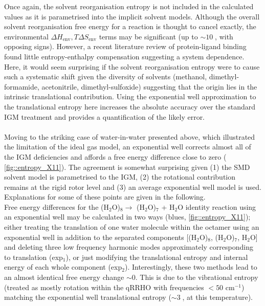 \documentclass[../main.tex]{subfiles}
\begin{document}
Once again, the solvent reorganisation entropy is not included in the calculated values as it is parametrised into the implicit solvent models. Although the overall solvent reorganisation free energy for a reaction is thought to cancel exactly, the environmental $\Delta H_\text{env}, T\Delta S_\text{env}$ terms may be significant (up to $\sim 10\;$\kcal, with opposing signs).\cite{Grunwald1995}
However, a recent literature review of protein-ligand binding found little entropy-enthalpy compensation suggesting a system dependence.\cite{Chodera2013} Here, it would seem surprising if the solvent reorganisation entropy were to cause such a systematic shift given the diversity of solvents (methanol, dimethyl-formamide, acetonitrile, dimethyl-sulfoxide) suggesting that the origin lies in the intrinsic translational contribution. Using the exponential well approximation to the translational entropy here increases the absolute accuracy over the standard IGM treatment and provides a quantification of the likely error. 
\\\\
Moving to the striking case of water-in-water presented above, which illustrated the limitation of the ideal gas model, an exponential well corrects almost all of the IGM deficiencies and affords a free energy difference close to zero (\figurename{ \ref{fig::entropy_X11}}). The agreement is somewhat surprising given (1) the SMD solvent model is parametrised to the IGM, (2) the rotational contribution remains at the rigid rotor level and (3) an average exponential well model is used. Explanations for some of these points are given in the following.
\\
Free energy differences for the (H$_2$O)$_8 \longrightarrow$ (H$_2$O)$_7$ +  H$_2$O identity reaction using an exponential well may be calculated in two ways (blues, \figurename{ \ref{fig::entropy_X11}}); either treating the translation of one water molecule within the octamer using an exponential well in addition to the separated components [(H$_2$O)$_8$, (H$_2$O)$_7$, H$_2$O] and deleting three low frequency harmonic modes approximately corresponding to translation (exp$_1$), or just modifying the translational entropy and internal energy of each whole component  (exp$_2$). Interestingly, these two methods lead to an almost identical free energy change $\sim 0$. This is due to the vibrational entropy (treated as mostly rotation within the qRRHO with frequencies $< 50$ cm$^{-1}$) matching the exponential well translational entropy ($\sim 3\;$\kcal, at this temperature). 
\vspace{0.4cm}
\end{document}
